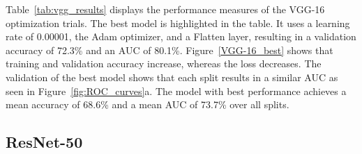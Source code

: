 \documentclass[sn-mathphys,Numbered]{sn-jnl}%
\theoremstyle{thmstyleone}%
\theoremstyle{thmstyletwo}%
\theoremstyle{thmstylethree}%
\begin{document}
\noindent Table~\ref{tab:vgg_results} displays the performance measures of the VGG-16 optimization trials. The best model is highlighted in the table. It uses a learning rate of 0.00001, the Adam optimizer, and a Flatten layer, resulting in a validation accuracy of 72.3\% and an AUC of 80.1\%. Figure~\ref{VGG-16_best} shows that training and validation accuracy increase, whereas the loss decreases. The validation of the best model shows that each split results in a similar AUC as seen in Figure~\ref{fig:ROC_curves}a. The model with best performance achieves a mean accuracy of 68.6\% and a mean AUC of 73.7\% over all splits.
\subsection{ResNet-50}
\label{ResNet_Results}
\def\btc{\begin{tabular}{c}}
\def\etc{\end{tabular}}
\end{document}
